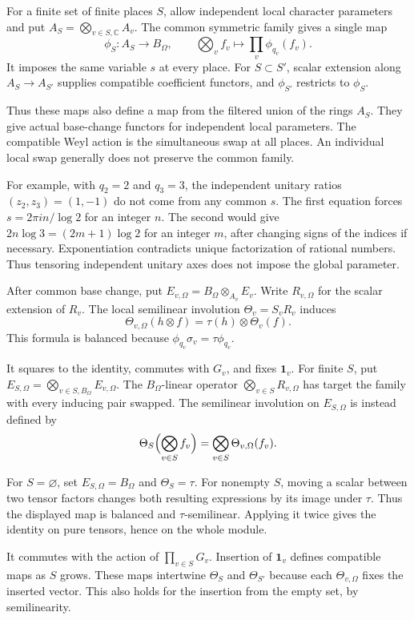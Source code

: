 For a finite set of finite places $S$, allow independent local character
parameters and put $A_S=\bigotimes_{v\in S,\mathbb C}A_v$.
The common symmetric family gives a single map
\[
 \phi_S:A_S\longrightarrow B_\Omega,\qquad
 \bigotimes_v f_v\longmapsto\prod_v\phi_{q_v}(f_v).
\]
It imposes the same variable $s$ at every place.
For $S\subset S'$, scalar extension along $A_S\to A_{S'}$ supplies
compatible coefficient functors, and $\phi_{S'}$ restricts to $\phi_S$.

Thus these maps also define a map from the filtered union of the rings $A_S$.
They give actual base-change functors for independent local parameters.
The compatible Weyl action is the simultaneous swap at all places.
An individual local swap generally does not preserve the common family.

For example, with $q_2=2$ and $q_3=3$, the independent unitary ratios
$(z_2,z_3)=(1,-1)$ do not come from any common $s$.
The first equation forces $s=2\pi i n/\log2$ for an integer $n$.
The second would give $2n\log3=(2m+1)\log2$ for an integer $m$,
after changing signs of the indices if necessary.
Exponentiation contradicts unique factorization of rational numbers.
Thus tensoring independent unitary axes does not impose the global parameter.

After common base change, put $E_{v,\Omega}=B_\Omega\otimes_{A_v}E_v$.
Write $R_{v,\Omega}$ for the scalar extension of $R_v$.
The local semilinear involution $\Theta_v=S_vR_v$ induces
\[
 \Theta_{v,\Omega}(h\otimes f)=\tau(h)\otimes\Theta_v(f).
\]
This formula is balanced because $\phi_{q_v}\sigma_v=\tau\phi_{q_v}$.

It squares to the identity, commutes with $G_v$, and fixes $\mathbf1_v$.
For finite $S$, put $E_{S,\Omega}=\bigotimes_{v\in S,B_\Omega}E_{v,\Omega}$.
The $B_\Omega$-linear operator $\bigotimes_{v\in S}R_{v,\Omega}$
has target the family with every inducing pair swapped.
The semilinear involution on $E_{S,\Omega}$ is instead defined by
\[
 \Theta_S\Bigl(\bigotimes_{v\in S}f_v\Bigr)
     =\bigotimes_{v\in S}\Theta_{v,\Omega}(f_v).
\]

For $S=\varnothing$, set $E_{S,\Omega}=B_\Omega$ and $\Theta_S=\tau$.
For nonempty $S$, moving a scalar between two tensor factors changes
both resulting expressions by its image under $\tau$.
Thus the displayed map is balanced and $\tau$-semilinear.
Applying it twice gives the identity on pure tensors, hence on the whole module.

It commutes with the action of $\prod_{v\in S}G_v$.
Insertion of $\mathbf1_v$ defines compatible maps as $S$ grows.
These maps intertwine $\Theta_S$ and $\Theta_{S'}$ because each
$\Theta_{v,\Omega}$ fixes the inserted vector.
This also holds for the insertion from the empty set, by semilinearity.

